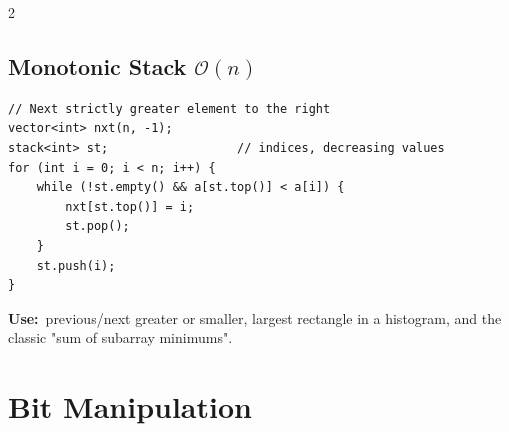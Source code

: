 \documentclass[10pt]{article}
\newcommand{\sub}[2]{\subsection[#1]{#1\hspace{0.6em}%
  \textnormal{\color{accent2}\small$\mathcal{O}(#2)$}}}
\newcommand{\uses}[1]{{\color{accent2}\footnotesize\textbf{Use:}}~{\footnotesize #1}\par}
\begin{document}
\begin{multicols}{2}
\sub{Monotonic Stack}{n}
\begin{lstlisting}
// Next strictly greater element to the right
vector<int> nxt(n, -1);
stack<int> st;                  // indices, decreasing values
for (int i = 0; i < n; i++) {
    while (!st.empty() && a[st.top()] < a[i]) {
        nxt[st.top()] = i;
        st.pop();
    }
    st.push(i);
}
\end{lstlisting}
\uses{previous/next greater or smaller, largest rectangle in a
histogram, and the classic "sum of subarray minimums".}

\end{multicols}

\section{Bit Manipulation}
\end{document}
